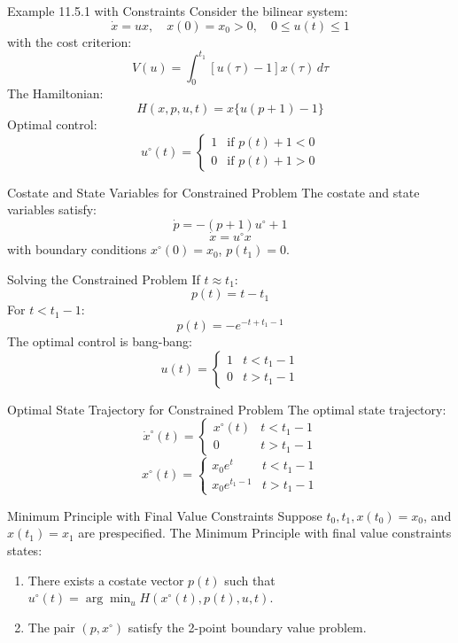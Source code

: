 \documentclass[10pt]{beamer}
\begin{document}
\begin{frame}[fragile]{Example 11.5.1 with Constraints}
  Consider the bilinear system:
  \[
  \dot{x} = ux, \quad x(0) = x_0 > 0, \quad 0 \le u(t) \le 1
  \]
  with the cost criterion:
  \[
  V(u) = \int_0^{t_1} [u(\tau) - 1] x(\tau) \, d\tau
  \]
  The Hamiltonian:
  \[
  H(x, p, u, t) = x \{ u(p + 1) - 1 \}
  \]
  Optimal control:
  \[
  u^\circ(t) = \begin{cases}
  1 & \text{if } p(t) + 1 < 0 \\
  0 & \text{if } p(t) + 1 > 0
  \end{cases}
  \]
\end{frame}
  
\begin{frame}[fragile]{Costate and State Variables for Constrained Problem}
  The costate and state variables satisfy:
  \[
  \dot{p} = -(p + 1) u^\circ + 1
  \]
  \[
  \dot{x} = u^\circ x
  \]
  with boundary conditions \( x^\circ(0) = x_0 \), \( p(t_1) = 0 \).
\end{frame}
  
\begin{frame}[fragile]{Solving the Constrained Problem}
  If \( t \approx t_1 \):
  \[
  p(t) = t - t_1
  \]
  For \( t < t_1 - 1 \):
  \[
  p(t) = -e^{-t + t_1 - 1}
  \]
  The optimal control is bang-bang:
  \[
  u(t) = \begin{cases}
  1 & t < t_1 - 1 \\
  0 & t > t_1 - 1
  \end{cases}
  \]
\end{frame}
  
\begin{frame}[fragile]{Optimal State Trajectory for Constrained Problem}
  The optimal state trajectory:
  \[
  \dot{x}^\circ(t) = \begin{cases}
  x^\circ(t) & t < t_1 - 1 \\
  0 & t > t_1 - 1
  \end{cases}
  \]
  \[
  x^\circ(t) = \begin{cases}
  x_0 e^t & t < t_1 - 1 \\
  x_0 e^{t_1 - 1} & t > t_1 - 1
  \end{cases}
  \]
\end{frame}
  
\begin{frame}[fragile]{Minimum Principle with Final Value Constraints}
  Suppose \( t_0, t_1, x(t_0) = x_0 \), and \( x(t_1) = x_1 \) are prespecified. The Minimum Principle with final value constraints states:
  \begin{enumerate}
      \item There exists a costate vector \( p(t) \) such that \( u^\circ(t) = \arg \min_u H(x^\circ(t), p(t), u, t) \).
      \item The pair \( (p, x^\circ) \) satisfy the 2-point boundary value problem.
  \end{enumerate}
\end{frame}
  
\end{document}
